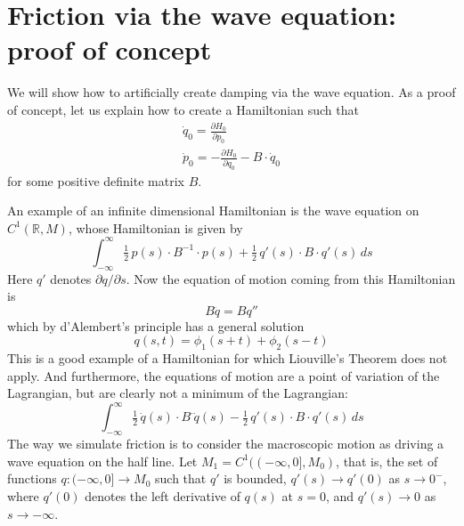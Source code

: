 \documentclass{amsart}
\begin{document}
\section{Friction via the wave equation: proof of concept}

We will show how to artificially create damping via the wave equation.  As a proof of concept, let us explain how to create a Hamiltonian such that
\begin{gather}
\label{q f m B}
\dot q_0 = \frac{\partial H_0}{\partial p_0} \\
\label{p f m B}
\dot p_0 = - \frac{\partial H_0}{\partial q_0} - B \cdot \dot q_0
\end{gather}
for some positive definite matrix $B$.

An example of an infinite dimensional Hamiltonian is the wave equation on $C^1(\mathbb R,M)$, whose Hamiltonian is given by
\begin{equation}
\int_{-\infty}^\infty \tfrac12\,p(s)\cdot B^{-1}\cdot p(s) + \tfrac12 \, q'(s)\cdot B \cdot q'(s) \, ds
\end{equation}
Here $q'$ denotes ${\partial q}/{\partial s}$.  Now the equation of motion coming from this Hamiltonian is
\begin{equation}
B \ddot q = B q''
\end{equation}
which by d'Alembert's principle has a general solution
\begin{equation}
\label{d'Alemb}
q(s,t) = \phi_1(s+t) + \phi_2(s-t)
\end{equation}
This is a good example of a Hamiltonian for which Liouville's Theorem does not apply.  And furthermore, the equations of motion are a point of variation of the Lagrangian, but are clearly not a minimum of the Lagrangian:
\begin{equation}
\int_{-\infty}^\infty \tfrac12\,\dot q(s)\cdot B^\cdot \dot q(s) - \tfrac12 \, q'(s)\cdot B \cdot q'(s) \, ds
\end{equation}
The way we simulate friction is to consider the macroscopic motion as driving a wave equation on the half line.  Let $M_1 = C^1((-\infty,0],M_0)$, that is, the set of functions $q:(-\infty,0]\to M_0$ such that $q'$ is bounded, $q'(s) \to q'(0)$ as $s\to 0^-$, where $q'(0)$ denotes the left derivative of $q(s)$ at $s=0$, and $q'(s) \to 0$ as $s \to -\infty$.
\end{document}
